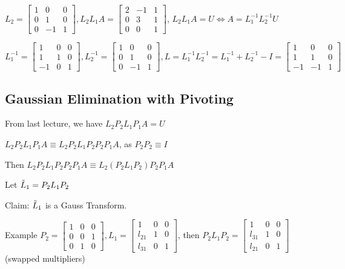 \documentclass{article}
\begin{document}
$L_2 = \begin{bmatrix}
1 & 0 & 0\\
0 & 1 & 0\\
0 & -1 & 1
\end{bmatrix}, L_2 L_1 A = \begin{bmatrix}
2 & -1 & 1\\
0 & 3 & 1\\
0 & 0 & 1
\end{bmatrix}$, $L_2 L_1 A = U \Leftrightarrow A = L_1^{-1} L_2^{-1} U$

\vspace{0.2cm}

$L_1^{-1} = \begin{bmatrix}
1 & 0 & 0\\
1 & 1 & 0\\
-1 & 0 & 1
\end{bmatrix}, L_2^{-1} = \begin{bmatrix}
1 & 0 & 0\\
0 & 1 & 0\\
0 & -1 & 1
\end{bmatrix}, L = L_1^{-1} L_2^{-1} = L_1^{-1} + L_2^{-1} - I = \begin{bmatrix}
1 & 0 & 0\\
1 & 1 & 0\\
-1 & -1 & 1
\end{bmatrix}$

\subsection{Gaussian Elimination with Pivoting}

From last lecture, we have $L_2 P_2 L_1 P_1 A = U$

$L_2 P_2 L_1 P_1 A \equiv L_2 P_2 L_1 P_2 P_2 P_1 A$, as $P_2 P_2 \equiv I$

Then $L_2 P_2 L_1 P_2 P_2 P_1 A \equiv L_2 ( P_2 L_1 P_2 ) P_2 P_1 A$

\vspace{0.2cm}

Let $\Tilde{L}_1 = P_2 L_1 P_2$ 

Claim: $\Tilde{L}_1$ is a Gauss Transform.

Example $P_2 = \begin{bmatrix}
1 & 0 & 0\\
0 & 0 & 1\\
0 & 1 & 0
\end{bmatrix}, L_1 = \begin{bmatrix}
1 & 0 & 0\\
l_{21} & 1 & 0\\
l_{31} & 0 & 1
\end{bmatrix}$, then $P_2 L_1 P_2 = \begin{bmatrix}
1 & 0 & 0\\
l_{31} & 1 & 0\\
l_{21} & 0 & 1
\end{bmatrix}$ (swapped multipliers)
\end{document}
